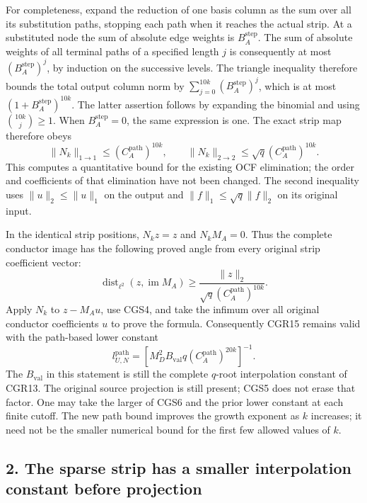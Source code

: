 For completeness, expand the reduction of one basis column as the sum over all its substitution paths, stopping each path when it reaches the actual strip. At a substituted node the sum of absolute edge weights is \(B_A^{\mathrm{step}}\). The sum of absolute weights of all terminal paths of a specified length \(j\) is consequently at most \((B_A^{\mathrm{step}})^j\), by induction on the successive levels. The triangle inequality therefore bounds the total output column norm by \(\sum_{j=0}^{10k}(B_A^{\mathrm{step}})^j\), which is at most \((1+B_A^{\mathrm{step}})^{10k}\). The latter assertion follows by expanding the binomial and using \(\binom{10k}{j}\ge1\). When \(B_A^{\mathrm{step}}=0\), the same expression is one. The exact strip map therefore obeys \[
\boxed{\|N_k\|_{1\to1}\le(C_A^{\mathrm{path}})^{10k},\qquad
\|N_k\|_{2\to2}\le\sqrt q(C_A^{\mathrm{path}})^{10k}.}
\tag{CGS4}
\] This computes a quantitative bound for the existing OCF elimination; the order and coefficients of that elimination have not been changed. The second inequality uses \(\|u\|_2\le\|u\|_1\) on the output and \(\|f\|_1\le\sqrt q\|f\|_2\) on its original input.

In the identical strip positions, \(N_kz=z\) and \(N_kM_A=0\). Thus the complete conductor image has the following proved angle from every original strip coefficient vector: \[
\boxed{\operatorname{dist}_{\ell^2}(z,\operatorname{im}M_A)
\ge\frac{\|z\|_2}{\sqrt q(C_A^{\mathrm{path}})^{10k}}.}
\tag{CGS5}
\] Apply \(N_k\) to \(z-M_Au\), use CGS4, and take the infimum over all original conductor coefficients \(u\) to prove the formula. Consequently CGR15 remains valid with the path-based lower constant \[
l_{U,N}^{\mathrm{path}}=
\left[M_D^2B_{\mathrm{val}}q
          (C_A^{\mathrm{path}})^{20k}\right]^{-1}.
\tag{CGS6}
\] The \(B_{\mathrm{val}}\) in this statement is still the complete \(q\)-root interpolation constant of CGR13. The original source projection is still present; CGS5 does not erase that factor. One may take the larger of CGS6 and the prior lower constant at each finite cutoff. The new path bound improves the growth exponent as \(k\) increases; it need not be the smaller numerical bound for the first few allowed values of \(k\).

\subsection{2. The sparse strip has a smaller interpolation constant before projection}\label{the-sparse-strip-has-a-smaller-interpolation-constant-before-projection}

